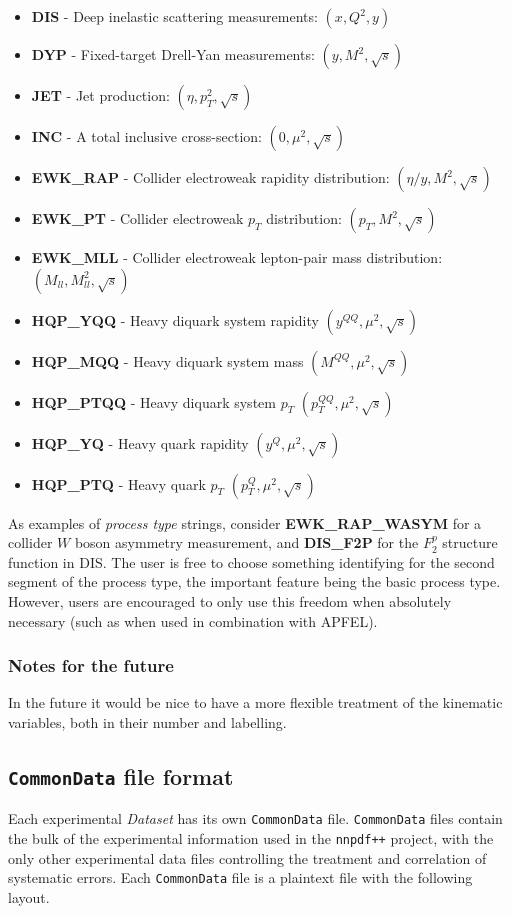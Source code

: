 \documentclass[11pt]{article}
\begin{document}
\begin{itemize}
\item \textbf{DIS} - Deep inelastic scattering measurements: $(x,Q^2,y)$
\item \textbf{DYP} - Fixed-target Drell-Yan measurements: $(y,M^2,\sqrt{s})$
\item \textbf{JET} - Jet production: $(\eta,p_T^2,\sqrt{s})$
\item \textbf{INC} - A total inclusive cross-section: $(0,\mu^2,\sqrt{s})$
\item \textbf{EWK\_RAP} - Collider electroweak rapidity distribution: $(\eta/y,M^2,\sqrt{s})$
\item \textbf{EWK\_PT} - Collider electroweak $p_T$ distribution: $(p_T,M^2,\sqrt{s})$
\item \textbf{EWK\_MLL} - Collider electroweak lepton-pair mass distribution: $(M_{ll},M_{ll}^2,\sqrt{s})$
\item \textbf{HQP\_YQQ} - Heavy diquark system rapidity $(y^{QQ},\mu^2,\sqrt{s})$
\item \textbf{HQP\_MQQ} - Heavy diquark system mass $(M^{QQ},\mu^2,\sqrt{s})$
\item \textbf{HQP\_PTQQ} - Heavy diquark system $p_T$ $(p_T^{QQ},\mu^2,\sqrt{s})$
\item \textbf{HQP\_YQ} - Heavy quark rapidity $(y^Q,\mu^2,\sqrt{s})$
\item \textbf{HQP\_PTQ} - Heavy quark $p_T$ $(p_T^Q,\mu^2,\sqrt{s})$
\end{itemize}

As examples of \emph{process type} strings, consider \textbf{EWK\_RAP\_WASYM} for a collider $W$ boson asymmetry measurement, and \textbf{DIS\_F2P} for the $F_2^p$ structure function in DIS. The user is free to choose something identifying for the second segment of the process type, the important feature being the basic process type. However, users are encouraged to only use this freedom when absolutely necessary (such as when used in combination with APFEL).

\subsubsection*{Notes for the future}
In the future it would be nice to have a more flexible treatment of the kinematic variables, both in their number and labelling.


\subsection{{\tt CommonData} file format}
Each experimental \emph{Dataset} has its own {\tt CommonData} file. {\tt CommonData} files contain the bulk of the experimental information used in the {\tt nnpdf++} project, with the only other experimental data files controlling the treatment and correlation of systematic errors. Each {\tt CommonData} file is a plaintext file with the following layout.
\end{document}

